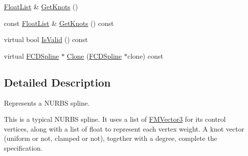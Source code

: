 \begin{DoxyCompactItemize}
\hyperlink{classfm_1_1vector}{FloatList} \& \hyperlink{classFCDNURBSSpline_a9c6ce1ca248d2dbc2f1b0457b03c50d8}{GetKnots} ()
\item 
const \hyperlink{classfm_1_1vector}{FloatList} \& \hyperlink{classFCDNURBSSpline_af30b06e230b9812c11c98085b5ca6d29}{GetKnots} () const 
\item 
virtual bool \hyperlink{classFCDNURBSSpline_a03760e2ca2bcf2b14814695b3af5be75}{IsValid} () const 
\item 
virtual \hyperlink{classFCDSpline}{FCDSpline} $\ast$ \hyperlink{classFCDNURBSSpline_a0390533ee410b9fde80866bc27b316e7}{Clone} (\hyperlink{classFCDSpline}{FCDSpline} $\ast$clone) const 
\end{DoxyCompactItemize}


\subsection{Detailed Description}
Represents a NURBS spline.

This is a typical NURBS spline. It uses a list of \hyperlink{classFMVector3}{FMVector3} for its control vertices, along with a list of float to represent each vertex weight. A knot vector (uniform or not, clamped or not), together with a degree, complete the specification. 

